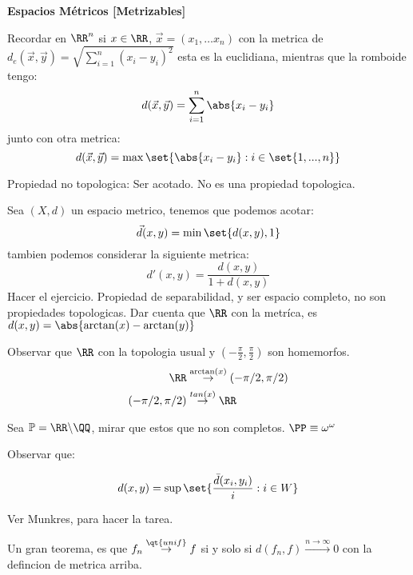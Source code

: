 \textbf{Espacios Métricos [Metrizables]}

Recordar en $ \RR^n $ si $ x \in \RR $, $ \vec{x} = (x_1, \ldots x_n) $
con la metrica de $ d_e(\vec{x},\vec{y}) = \sqrt{\sum_{i=1}^{n}(x_i - y_i)^2} $ esta es la euclidiana, mientras que la romboide tengo:
\[ d(\vec{x},\vec{y}) = \sum_{i=1}^{n} \abs{x_i - y_i} \]
junto con otra metrica: 
\[ d(\vec{x}, \vec{y}) = \operatorname{max}\set{\abs{x_i - y_i}: i \in \set{1, ..., n}} \]

Propiedad no topologica: Ser acotado. No es una propiedad topologica.

Sea $(X,d)$ un espacio metrico, tenemos que podemos acotar:
\[ \vec{d}(x,y) = \operatorname{min}\set{d(x,y),1} \]
tambien podemos considerar la siguiente metrica:
\[ d'(x,y) = \frac{d(x,y)}{1 + d(x,y)} \]
Hacer el ejercicio.
Propiedad de separabilidad, y ser espacio completo, no son propiedades topologicas.
Dar cuenta que $\RR$ con la metríca, es $ d(x,y) = \abs{\arctan(x)-\arctan(y)} $

Observar que $ \RR  $ con la topologia usual y $ (-\frac{\pi}{2} , \frac{\pi}{2}) $ son homemorfos.
\begin{align*}
\RR &\overset{\arctan(x)}{\rightarrow} (-\pi/2, \pi/2) \\
(-\pi/2, \pi/2) &\overset{tan(x)}{\rightarrow} \RR
\end{align*}

Sea $ \mathbb{P} = \RR \backslash \QQ $, mirar que estos que no son completos. $ \PP \equiv \omega^{\omega} $

Observar que:

\[ d(x,y) = \sup\set{\frac{\bar{d}(x_i,y_i)}{i} : i \in W}\]

Ver Munkres, para hacer la tarea. 

Un gran teorema, es que $ f_n \overset{\qt{unif}}{\rightarrow}f $ si y solo si $ d(f_n,f) \overset{n \rightarrow \infty}{\rightarrow} 0 $ con la defincion de metrica arriba.